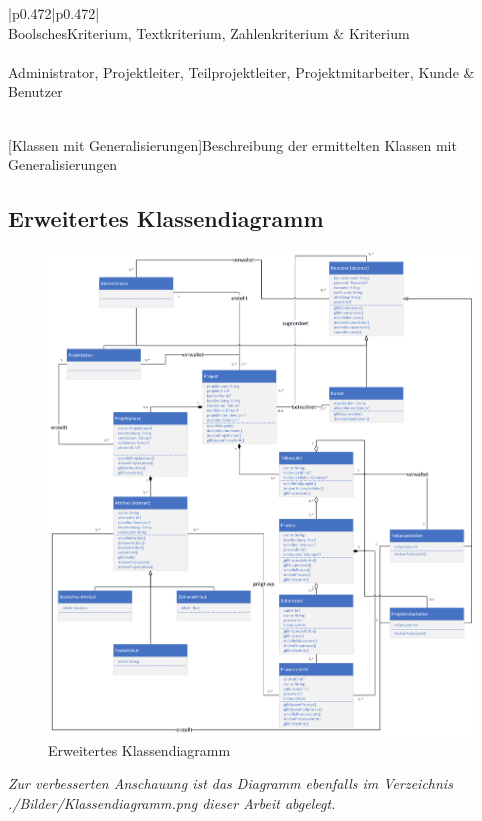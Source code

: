 \begin{xltabular}{\textwidth}{|p{0.472\textwidth}|p{0.472\textwidth}|}
    \hline
    \\\hline\hline
    BoolschesKriterium, Textkriterium, Zahlenkriterium & Kriterium \\\hline
    \\\hline\hline
    Administrator, Projektleiter, Teilprojektleiter, Projektmitarbeiter, Kunde & Benutzer \\\hline
    \\\hline
\end{xltabular}
[Klassen mit Generalisierungen]{Beschreibung der ermittelten Klassen mit Generalisierungen}
\newpage
\subsection{Erweitertes Klassendiagramm}
\begin{figure}[h!]
    \centering
    \includegraphics[scale=0.45]{./Bilder/Klassendiagramm.png}
    \caption[Erweitertes Klassendiagramm]{Erweitertes Klassendiagramm}
    \label{fig:Klassendiagramm}
\end{figure}
\emph{Zur verbesserten Anschauung ist das Diagramm ebenfalls im Verzeichnis ./Bilder/Klassendiagramm.png dieser Arbeit abgelegt.}

